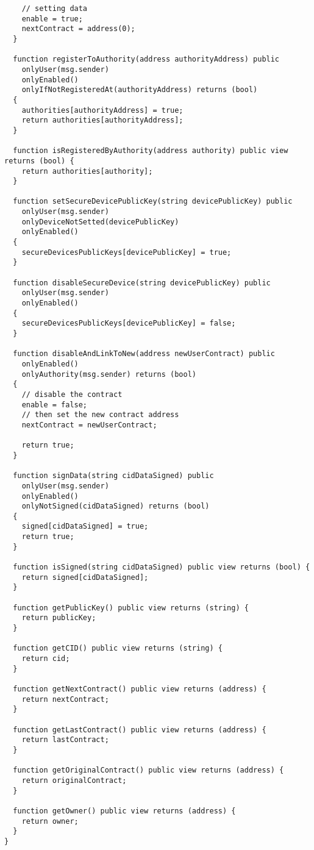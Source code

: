 \begin{lstlisting}
    // setting data
    enable = true;
    nextContract = address(0);
  }

  function registerToAuthority(address authorityAddress) public
    onlyUser(msg.sender)
    onlyEnabled()
    onlyIfNotRegisteredAt(authorityAddress) returns (bool) 
  {
    authorities[authorityAddress] = true;
    return authorities[authorityAddress];
  }

  function isRegisteredByAuthority(address authority) public view returns (bool) {
    return authorities[authority];
  }

  function setSecureDevicePublicKey(string devicePublicKey) public 
    onlyUser(msg.sender)
    onlyDeviceNotSetted(devicePublicKey)
    onlyEnabled()
  {
    secureDevicesPublicKeys[devicePublicKey] = true;
  }

  function disableSecureDevice(string devicePublicKey) public 
    onlyUser(msg.sender)
    onlyEnabled()
  {
    secureDevicesPublicKeys[devicePublicKey] = false;
  }

  function disableAndLinkToNew(address newUserContract) public 
    onlyEnabled()
    onlyAuthority(msg.sender) returns (bool)
  {
    // disable the contract
    enable = false;
    // then set the new contract address
    nextContract = newUserContract;

    return true;
  }

  function signData(string cidDataSigned) public
    onlyUser(msg.sender)
    onlyEnabled()
    onlyNotSigned(cidDataSigned) returns (bool) 
  {
    signed[cidDataSigned] = true;
    return true;
  }

  function isSigned(string cidDataSigned) public view returns (bool) {
    return signed[cidDataSigned];
  }

  function getPublicKey() public view returns (string) {
    return publicKey;
  }

  function getCID() public view returns (string) {
    return cid;
  }

  function getNextContract() public view returns (address) {
    return nextContract;
  }

  function getLastContract() public view returns (address) {
    return lastContract;
  }

  function getOriginalContract() public view returns (address) {
    return originalContract;
  }

  function getOwner() public view returns (address) {
    return owner;
  }
}
\end{lstlisting}